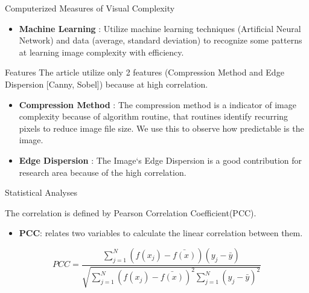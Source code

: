 \documentclass{beamer}
\begin{document}
\begin{frame}{Computerized Measures of Visual Complexity}
    \begin{itemize}
        \item \textbf{Machine Learning} : Utilize machine learning techniques (Artificial Neural Network) and data (average, standard deviation) to recognize some patterns at learning image complexity with efficiency. 
    \end{itemize}
\end{frame}
\begin{frame}{Features}
	The article utilize only 2 features (Compression Method and Edge Dispersion [Canny, Sobel]) because at high correlation.
    \begin{itemize}
        \item \textbf{Compression Method} : The compression method is a indicator of image complexity because of algorithm routine, that routines identify recurring pixels to reduce image file size. We use this to observe how predictable is the image.
        \item \textbf{ Edge Dispersion } : The Image`s Edge Dispersion is a good contribution for research area because of the high  correlation.
    \end{itemize}
\end{frame}


\begin{frame}{Statistical Analyses}

The correlation is defined by Pearson Correlation Coefficient(PCC).

\begin{itemize}
	\item \textbf{PCC}: relates two variables to calculate the linear correlation between them.
\end{itemize}

\begin{equation}
PCC = \frac{\sum_{j = 1}^{N} (f(x_j) - \bar{f(x)})(y_j - \bar{y})}{\sqrt{\sum_{j =1}^{N} (f(x_j) - \bar{f(x)})^2 \sum_{j = 1}^{N} (y_j - \bar{y})^2 }}
\end{equation}
\end{frame}
\end{document}
